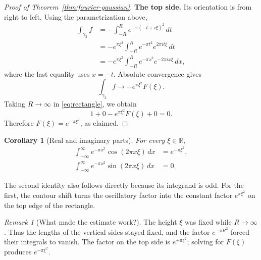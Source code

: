 \documentclass[11pt]{article}
\theoremstyle{plain}
\newtheorem{corollary}[theorem]{Corollary}
\theoremstyle{definition}
\theoremstyle{remark}
\newtheorem*{remark}{Remark}
\numberwithin{equation}{section}
\newcommand{\R}{\mathbb{R}}
\begin{document}
\begin{proof}[Proof of Theorem~\ref{thm:fourier-gaussian}]
\textbf{The top side.} Its orientation is from right to left. Using the
parametrization above,
\begin{align*}
 \int_{\gamma_3}f
 &=-\int_{-R}^{R}e^{-\pi(-t+i\xi)^2}\,dt\\
 &=-e^{\pi\xi^2}\int_{-R}^{R}e^{-\pi t^2}e^{2\pi it\xi}\,dt\\
 &=-e^{\pi\xi^2}\int_{-R}^{R}e^{-\pi x^2}e^{-2\pi ix\xi}\,dx,
\end{align*}
where the last equality uses $x=-t$. Absolute convergence gives
\[
 \int_{\gamma_3}f\longrightarrow-e^{\pi\xi^2}F(\xi).
\]
Taking $R\to\infty$ in \eqref{eq:rectangle}, we obtain
\[
 1+0-e^{\pi\xi^2}F(\xi)+0=0.
\]
Therefore $F(\xi)=e^{-\pi\xi^2}$, as claimed.
\end{proof}

\begin{corollary}[Real and imaginary parts]
For every $\xi\in\R$,
\begin{align}
 \int_{-\infty}^{\infty}e^{-\pi x^2}\cos(2\pi x\xi)\,dx
 &=e^{-\pi\xi^2},\\
 \int_{-\infty}^{\infty}e^{-\pi x^2}\sin(2\pi x\xi)\,dx
 &=0.
\end{align}
\end{corollary}
The second identity also follows directly because its integrand is odd.
For the first, the contour shift turns the oscillatory factor into the
constant factor $e^{\pi\xi^2}$ on the top edge of the rectangle.

\begin{remark}[What made the estimate work?]
The height $\xi$ was fixed while $R\to\infty$. Thus the lengths of the
vertical sides stayed fixed, and the factor $e^{-\pi R^2}$ forced their
integrals to vanish. The factor on the top side is $e^{+\pi\xi^2}$;
solving for $F(\xi)$ produces $e^{-\pi\xi^2}$.
\end{remark}
\end{document}
